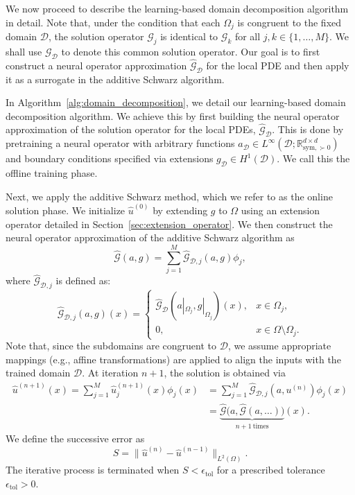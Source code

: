 \documentclass[preprint,11pt]{elsarticle}
\theoremstyle{plain}
\begin{document}
We now proceed to describe the learning-based domain decomposition algorithm in detail. Note that, under the condition that each $\Omega_j$ is congruent to the fixed domain $\mathcal{D}$, the solution operator $\mathcal{G}_j$ is identical to $\mathcal{G}_k$ for all $j, k \in \{1, \dots, M\}$. We shall use $\mathcal{G}_\mathcal{D}$ to denote this common solution operator. Our goal is to first construct a neural operator approximation $\hat{\mathcal{G}}_\mathcal{D}$ for the local PDE and then apply it as a surrogate in the additive Schwarz algorithm.

In Algorithm~\ref{alg:domain_decomposition}, we detail our learning-based domain decomposition algorithm. We achieve this by first building the neural operator approximation of the solution operator for the local PDEs, $\hat{\mathcal{G}}_\mathcal{D}$. This is done by pretraining a neural operator with arbitrary functions $a_\mathcal{D} \in L^{\infty}(\mathcal{D}; \mathbb{R}^{d \times d}_{\text{sym}, \succ 0})$ and boundary conditions specified via extensions $g_\mathcal{D} \in H^{1}(\mathcal{D})$. We call this the offline training phase.

Next, we apply the additive Schwarz method, which we refer to as the online solution phase. We initialize $\hat{u}^{(0)}$ by extending $g$ to $\Omega$ using an extension operator detailed in Section~\ref{sec:extension_operator}. We then construct the neural operator approximation of the additive Schwarz algorithm as
\begin{equation}
\hat{\mathcal{G}}(a,g) = \sum_{j=1}^{M} \hat{\mathcal{G}}_{\mathcal{D},j}(a,g) \phi_j,
\end{equation}
where $\hat{\mathcal{G}}_{\mathcal{D},j}$ is defined as:
\begin{equation}
\hat{\mathcal{G}}_{\mathcal{D},j}(a,g)(x) = 
\begin{cases}
    \hat{\mathcal{G}}_\mathcal{D}(a|_{\Omega_j}, g|_{\Omega_j})(x), & x \in \Omega_j, \\
    0, & x \in \Omega \setminus \Omega_j.
\end{cases}
\end{equation}
Note that, since the subdomains are congruent to $\mathcal{D}$, we assume appropriate mappings (e.g., affine transformations) are applied to align the inputs with the trained domain $\mathcal{D}$. At iteration $n+1$, the solution is obtained via
\begin{align}
\hat{u}^{(n+1)}(x) = \sum_{j=1}^{M} \hat{u}_{j}^{(n+1)}(x) \phi_j(x) 
&= \sum_{j=1}^{M} \hat{\mathcal{G}}_{\mathcal{D},j}(a, u^{(n)}) \phi_j(x) \\ &= \underbrace{\hat{\mathcal{G}} \big( a, \hat{\mathcal{G}}(a, \dots ) \big)}_{n+1 \ \text{times}}(x).
\end{align}
We define the successive error as
\begin{equation} \label{eq:successive_error}
S = \|\hat{u}^{(n)} - \hat{u}^{(n-1)}\|_{L^2(\Omega)}.
\end{equation}
The iterative process is terminated when $S < \epsilon_{\text{tol}}$ for a prescribed tolerance $\epsilon_{\text{tol}} > 0$.
\end{document}
